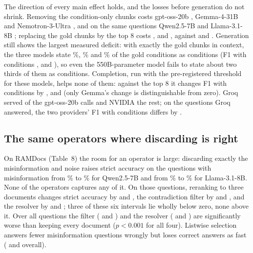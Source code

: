The direction of every main effect holds, and the losses before generation do not shrink. Removing the condition-only chunks costs gpt-oss-20b \hCTwoOss, Gemma-4-31B \hCTwoGemma{} and Nemotron-3-Ultra \hCTwoNemo, and on the same questions Qwen2.5-7B \hCTwoQwenSamePt{} and Llama-3.1-8B \hCTwoLlamaSamePt; replacing the gold chunks by the top 8 costs \hEOneOssPt, \hEOneGemmaPt{} and \hEOneNemoPt, against \hEOneQwenSamePt{} and \hEOneLlamaSamePt. Generation still shows the largest measured deficit: with exactly the gold chunks in context, the three models state \hRecallOss\%, \hRecallGemma\% and \hRecallNemo\% of the gold conditions as conditions (F1 with conditions \hGoldOss, \hGoldGemma{} and \hGoldNemo), so even the 550B-parameter model fails to state about two thirds of them as conditions. Completion, run with the pre-registered threshold for these models, helps none of them: against the top 8 it changes F1 with conditions by \hCSevenOssPt, \hCSevenGemmaPt{} and \hCSevenNemoPt{} (only Gemma's change is distinguishable from zero). Groq served \hServedGroqOss{} of the \hServedTotalOss{} gpt-oss-20b calls and NVIDIA the rest; on the questions Groq answered, the two providers' F1 with conditions differs by \provDiff.



\subsection{The same operators where discarding is right}
\label{sec:ramdocs}

On RAMDocs (Table~8) the room for an operator is large: discarding exactly the misinformation and noise raises strict accuracy on the questions with misinformation from \ramFullMiQwen\% to \ramOracleMiQwen\% for Qwen2.5-7B and from \ramFullMiLlama\% to \ramOracleMiLlama\% for Llama-3.1-8B. None of the operators captures any of it. On those questions, reranking to three documents changes strict accuracy by \ramRerankEffQwenPt{} and \ramRerankEffLlamaPt, the contradiction filter by \ramNliEffQwenPt{} and \ramNliEffLlamaPt, and the resolver by \ramCrsEffQwenPt{} and \ramCrsEffLlamaPt; three of these six intervals lie wholly below zero, none above it. Over all questions the filter (\ramNliEffAllQwenPt{} and \ramNliEffAllLlamaPt) and the resolver (\ramCrsEffAllQwenPt{} and \ramCrsEffAllLlamaPt) are significantly worse than keeping every document ($p<0.001$ for all four). Listwise selection answers fewer misinformation questions wrongly but loses correct answers as fast (\ramSelectEffAllQwenPt{} and \ramSelectEffAllLlamaPt{} overall).

